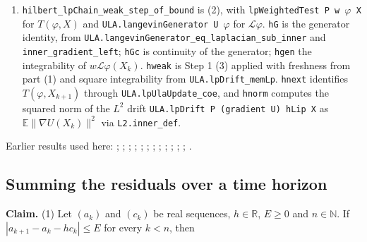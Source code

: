 \documentclass[11pt,a4paper]{report}
\begin{document}
\begin{leanbox}
\begin{enumerate}
\item \texttt{hilbert\_\allowbreak{}lp\allowbreak{}Chain\_\allowbreak{}weak\_\allowbreak{}step\_\allowbreak{}of\_\allowbreak{}bound} is (2), with \texttt{lp\allowbreak{}Weighted\allowbreak{}Test P w \ensuremath{\varphi} X} for \(T(\varphi,X)\) and \texttt{ULA.\allowbreak{}langevin\allowbreak{}Generator U \ensuremath{\varphi}} for \(\mathcal L\varphi\). \texttt{h\allowbreak{}G} is the generator identity, from \texttt{ULA.\allowbreak{}langevin\allowbreak{}Generator\_\allowbreak{}eq\_\allowbreak{}laplacian\_\allowbreak{}sub\_\allowbreak{}inner} and \texttt{inner\_\allowbreak{}gradient\_\allowbreak{}left}; \texttt{h\allowbreak{}Gc} is continuity of the generator; \texttt{hgen} the integrability of \(w\mathcal L\varphi(X_k)\). \texttt{hweak} is Step 1 (3) applied with freshness from part (1) and square integrability from \texttt{ULA.\allowbreak{}lp\allowbreak{}Drift\_\allowbreak{}mem\allowbreak{}Lp}. \texttt{hnext} identifies \(T(\varphi,X_{k+1})\) through \texttt{ULA.\allowbreak{}lp\allowbreak{}Ula\allowbreak{}Update\_\allowbreak{}coe}, and \texttt{hnorm} computes the squared norm of the \(L^2\) drift \texttt{ULA.\allowbreak{}lp\allowbreak{}Drift P (gradient U) h\allowbreak{}Lip X} as \(\mathbb E\|\nabla U(X_k)\|^2\) via \texttt{L2.\allowbreak{}inner\_\allowbreak{}def}.

\end{enumerate}
\end{leanbox}


Earlier results used here: \cite[Section~3.13.11]{LangevinLean2026ULASC}; \cite[Section~3.13.12]{LangevinLean2026ULASC}; \cite[Section~3.13.2]{LangevinLean2026ULASC}; \cite[Section~3.13.3]{LangevinLean2026ULASC}; \cite[Section~3.13.4]{LangevinLean2026ULASC}; \cite[Section~3.19.1]{LangevinLean2026ULASC}; \cite[Section~3.20.1]{LangevinLean2026ULASC}; \cite[Section~3.23.1]{LangevinLean2026ULASC}; \cite[Section~3.23.2]{LangevinLean2026ULASC}; \cite[Section~3.42.1]{LangevinLean2026ULASC}; \cite[Section~3.46.14]{LangevinLean2026ULASC}; \cite[Section~3.46.2]{LangevinLean2026ULASC}; \cite[Section~3.46.8]{LangevinLean2026ULASC}.
\subsection{\texorpdfstring{Summing the residuals over a time horizon}{Summing the residuals over a time horizon}}
\label{report-step-AverageLMC-LaplacianWeakChain-lean-3}


\textbf{Claim.} (1) Let \((a_k)\) and \((c_k)\) be real sequences, \(h\in\mathbb R\), \(E\ge0\) and \(n\in\mathbb N\). If \(|a_{k+1}-a_k-hc_k|\le E\) for every \(k<n\), then
\end{document}
